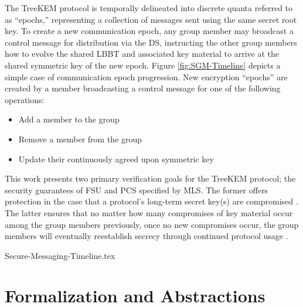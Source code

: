 \documentclass[authordraft,sigconf]{acmart}
\newcommand{\Abrev}[1]{\gls{#1}}
\begin{document}
The TreeKEM protocol is temporally delineated into discrete quanta referred to as ``epochs,'' representing a collection of messages sent using the same secret root key.
To create a new communication epoch, any group member may broadcast a control message for distribution via the \Abrev{DS}, instructing the other group members how to evolve the shared \Abrev{LBBT} and associated key material to arrive at the shared symmetric key of the new epoch.
Figure \ref{fig:SGM-Timeline} depicts a simple case of communication epoch progression.
New encryption ``epochs'' are created by a member broadcasting a control message for one of the following operations:

\begin{itemize}
	\item Add a member to the group
	\item Remove a member from the group
	\item Update their continuously agreed upon symmetric key
\end{itemize}

This work presents two primary verification goals for the TreeKEM protocol; the security guarantees of \Abrev{FSU} and  \Abrev{PCS} specified by \Abrev{MLS}.
The former offers protection in the case that a protocol's long-term secret key(s) are compromised \cite{boyd2021modern}.
The latter ensures that no matter how many compromises of key material occur among the group members previously, once no new compromises occur, the group members will eventually reestablish secrecy through continued protocol usage \cite{CohnGordon2016}.\\[-1mm]

\begin{figure*}[ht!]
\centering
{Secure-Messaging-Timeline.tex}
\caption{\Abrev{SGM} Timeline depicting the progression of \Abrev{SGM} communication epochs $t_{n-1}$, $t_{n}$, and $t_{n+1}$ between Alice and Bob. The participants exchange (mediated by the \Abrev{DS}) sets of messages $M_{n-1}$, $M_{n}$, and $M_{n-1}$ during epochs $t_{n-1}$, $t_{n}$, and $t_{n+1}$, respectively.\label{fig:SGM-Timeline}}%
\end{figure*}


\section{Formalization and Abstractions\label{sec:Formal-Abstractions}}
\end{document}

